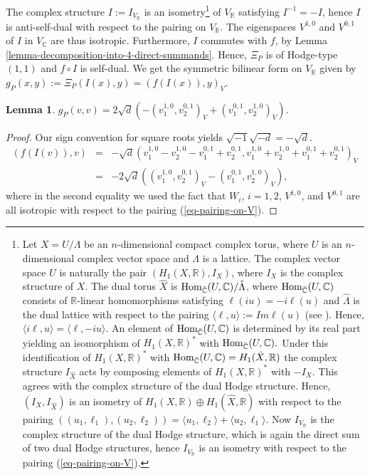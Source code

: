 \documentclass[12pt]{amsart}
\numberwithin{equation}{subsection}
\theoremstyle{plain}
\newtheorem{lem}[thm]{Lemma}
\theoremstyle{definition}
\newcommand{\CC}{{\mathbb C}}
\newcommand{\RR}{{\mathbb R}}
\newcommand{\Hom}{{\rm Hom}}
\begin{document}
The complex structure $I:=I_{V_\RR}$ is an isometry\footnote{
Let $X=U/\Lambda$ be an $n$-dimensional compact complex torus, where $U$ is an $n$-dimensional complex vector space and $\Lambda$ is a lattice. The complex vector space $U$ is naturally the pair $(H_1(X,\RR),I_X)$, where $I_X$ is the complex structure of $X$. The dual torus  $\hat{X}$ is $\Hom_{\bar{\CC}}(U,\CC)/\hat{\Lambda}$, where $\Hom_{\bar{\CC}}(U,\CC)$ consists of $\RR$-linear homomorphisms satisfying $\ell(iu)=-i\ell(u)$ and $\hat{\Lambda}$ is the dual lattice with respect to the pairing 
$\langle \ell,u\rangle:=Im\ell(u)$ (see \cite[Sec. 2.4]{BL}). Hence, $\langle i\ell,u\rangle=\langle\ell,-i u\rangle$. 
An element of $\Hom_{\bar{\CC}}(U,\CC)$ is determined by its real part yielding an isomorphism of $H_1(X,\RR)^*$ with $\Hom_{\bar{\CC}}(U,\CC).$
Under this identification of $H_1(X,\RR)^*$ with $\Hom_{\bar{\CC}}(U,\CC)=H_1(\hat{X},\RR)$ the complex structure $I_{\hat{X}}$ acts by composing elements of $H_1(X,\RR)^*$ with $-I_X$. 
This agrees with the complex structure of the dual Hodge structure.
Hence, $(I_X,I_{\hat{X}})$ is an isometry 
of $H_1(X,\RR)\oplus H_1(\hat{X},\RR)$ with respect to the pairing $((u_1,\ell_1),(u_2,\ell_2))=\langle u_1,\ell_2\rangle+\langle u_2,\ell_1\rangle$. 
Now $I_{V_\RR}$ is the complex structure of the dual Hodge structure, which is again the direct sum of two dual Hodge structures, hence
$I_{V_\RR}$ is an isometry with respect to the pairing (\ref{eq-pairing-on-V}).
} of $V_\RR$ 
satisfying $I^{-1}=-I$, hence $I$ is anti-self-dual with respect to the pairing on $V_\RR$. 
The eigenspaces $V^{1,0}$ and $V^{0,1}$ of $I$ in $V_\CC$ are thus isotropic.
Furthermore, $I$ commutes with $f$, by Lemma \ref{lemma-decomposition-into-4-direct-summands}. Hence, $\Xi_P$ is of Hodge-type $(1,1)$ and $f\circ I$ is self-dual. 
We get the symmetric bilinear form on $V_\RR$ given by $g_P(x,y):=\Xi_P(I(x),y)=(f(I(x)),y)_V$. 

\begin{lem}
\label{lemma-g-P-in-terms-of-4-summands}
$g_P(v,v)=2\sqrt{d}(-(v_1^{1,0},v_2^{0,1})_V+(v_1^{0,1},v_2^{1,0})_V).$
\end{lem}

\begin{proof}
Our sign convention for square roots yields $\sqrt{-1}\sqrt{-d}=-\sqrt{d}$.
\begin{eqnarray*}
(f(I(v)),v)&=&-\sqrt{d}(v_1^{1,0}-v_2^{1,0}-v_1^{0,1}+v_2^{0,1},v_1^{1,0}+v_2^{1,0}+v_1^{0,1}+v_2^{0,1})_V
\\
&=&-2\sqrt{d}\left(
(v_1^{1,0},v_2^{0,1})_V-(v_1^{0,1},v_2^{1,0})_V
\right),
\end{eqnarray*}
where in the second equality we used the fact that $W_i$, $i=1,2$, $V^{1,0}$, and $V^{0,1}$ are all isotropic with respect to the pairing (\ref{eq-pairing-on-V}).
\end{proof}
\end{document}
